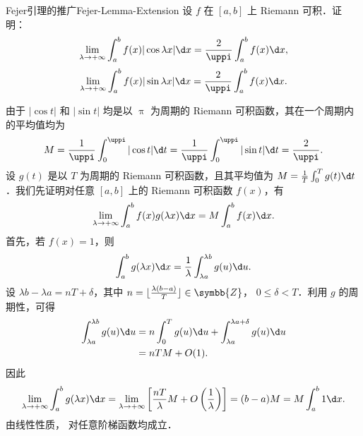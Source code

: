 \begin{problem}{Fejer引理的推广}{Fejer-Lemma-Extension}
    设 $f$ 在 $[a, b]$ 上 Riemann 可积．证明：
    \begin{equation}
        \lim_{\lambda \to +\infty} \int_{a}^{b} f(x)|\cos \lambda x| \d x = \frac{2}{\uppi} \int_{a}^{b} f(x) \d x,
    \end{equation}
    \begin{equation}
        \lim_{\lambda \to +\infty} \int_{a}^{b} f(x)|\sin \lambda x| \d x = \frac{2}{\uppi} \int_{a}^{b} f(x) \d x.
    \end{equation}
\end{problem}

\begin{myproof}
    由于 $|\cos t|$ 和 $|\sin t|$ 均是以 $\uppi$ 为周期的 Riemann 可积函数，其在一个周期内的平均值均为
    \begin{equation}\label{eq:avg-6}
        M = \frac{1}{\uppi} \int_{0}^{\uppi} |\cos t| \d t = \frac{1}{\uppi} \int_{0}^{\uppi} |\sin t| \d t = \frac{2}{\uppi}.
    \end{equation}
    设 $g(t)$ 是以 $T$ 为周期的 Riemann 可积函数，且其平均值为 $M = \frac{1}{T} \int_{0}^{T} g(t) \d t$．我们先证明对任意 $[a, b]$ 上的 Riemann 可积函数 $f(x)$，有
    \begin{equation}\label{eq:fejer-general-6}
        \lim_{\lambda \to +\infty} \int_{a}^{b} f(x)g(\lambda x) \d x = M \int_{a}^{b} f(x) \d x.
    \end{equation}
    首先，若 $f(x) = 1$，则
    \begin{equation}
        \int_{a}^{b} g(\lambda x) \d x = \frac{1}{\lambda} \int_{\lambda a}^{\lambda b} g(u) \d u.
    \end{equation}
    设 $\lambda b - \lambda a = n T + \delta$，其中 $n = \lfloor \frac{\lambda(b-a)}{T} \rfloor \in \symbb{Z}$， $0 \leqslant \delta < T$．利用 $g$ 的周期性，可得
    \begin{equation}
        \begin{aligned}
            \int_{\lambda a}^{\lambda b} g(u) \d u & = n \int_{0}^{T} g(u) \d u + \int_{\lambda a}^{\lambda a + \delta} g(u) \d u \\
                                                   & = n T M + O(1).
        \end{aligned}
    \end{equation}
    因此
    \begin{equation}
        \lim_{\lambda \to +\infty} \int_{a}^{b} g(\lambda x) \d x = \lim_{\lambda \to +\infty} \left[ \frac{n T}{\lambda} M + O\left(\frac{1}{\lambda}\right) \right] = (b-a) M = M \int_{a}^{b} 1 \d x.
    \end{equation}
    由线性性质， 对任意阶梯函数均成立．


\end{myproof}
